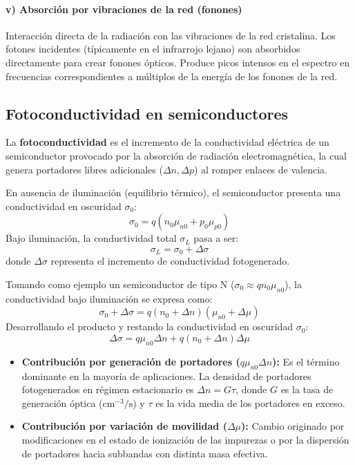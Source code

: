\paragraph{v) Absorción por vibraciones de la red (fonones)}
Interacción directa de la radiación con las vibraciones de la red cristalina. Los fotones incidentes (típicamente en el infrarrojo lejano) son absorbidos directamente para crear fonones ópticos. Produce picos intensos en el espectro en frecuencias correspondientes a múltiplos de la energía de los fonones de la red.

\newpage
\subsection{Fotoconductividad en semiconductores}

La \textbf{fotoconductividad} es el incremento de la conductividad eléctrica de un semiconductor provocado por la absorción de radiación electromagnética, la cual genera portadores libres adicionales ($\Delta n, \Delta p$) al romper enlaces de valencia.

En ausencia de iluminación (equilibrio térmico), el semiconductor presenta una conductividad en oscuridad $\sigma_0$:
\[
\sigma_0 = q (n_0 \mu_{n0} + p_0 \mu_{p0})
\]
Bajo iluminación, la conductividad total $\sigma_L$ pasa a ser:
\[
\sigma_L = \sigma_0 + \Delta\sigma
\]
donde $\Delta\sigma$ representa el incremento de conductividad fotogenerado.

\begin{concepto}
Tomando como ejemplo un semiconductor de tipo N ($\sigma_0 \approx q n_0 \mu_{n0}$), la conductividad bajo iluminación se expresa como:
\[
\sigma_0 + \Delta\sigma = q (n_0 + \Delta n)(\mu_{n0} + \Delta\mu)
\]
Desarrollando el producto y restando la conductividad en oscuridad $\sigma_0$:
\[
\Delta\sigma = q \mu_{n0} \Delta n + q (n_0 + \Delta n) \Delta\mu
\]
\begin{itemize}
    \item \textbf{Contribución por generación de portadores ($q \mu_{n0} \Delta n$):} Es el término dominante en la mayoría de aplicaciones. La densidad de portadores fotogenerados en régimen estacionario es $\Delta n = G \tau$, donde $G$ es la tasa de generación óptica ($\si{\cm^{-3}\per\second}$) y $\tau$ es la vida media de los portadores en exceso.
    \item \textbf{Contribución por variación de movilidad ($\Delta\mu$):} Cambio originado por modificaciones en el estado de ionización de las impurezas o por la dispersión de portadores hacia subbandas con distinta masa efectiva.
\end{itemize}
\end{concepto}


